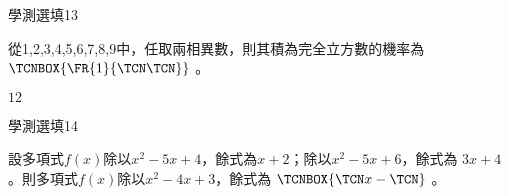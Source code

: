 \begin{QUESTIONS}
\begin{QUESTION}
\begin{QSOLLIST}
        \end{QSOLLIST}
        \begin{QEMPTYSPACE}
        \end{QEMPTYSPACE}
    \end{QUESTION}
    \begin{QUESTION}
        \begin{ExamInfo}{90}{學測}{選填}{13}
        \end{ExamInfo}
        \begin{ExamAnsRateInfo}{}{}{}{}
        \end{ExamAnsRateInfo}
        \begin{QBODY}
			從1,2,3,4,5,6,7,8,9中，任取兩相異數，則其積為完全立方數的機率為$\TCNBOX{\FR{1}{\TCN\TCN}}$
          。
        \end{QBODY}
        \begin{QFROMS}
        \end{QFROMS}
        \begin{QTAGS}\end{QTAGS}
        \begin{QANS}
            $12$
        \end{QANS}
        \begin{QSOLLIST}
        \end{QSOLLIST}
        \begin{QEMPTYSPACE}
        \end{QEMPTYSPACE}
    \end{QUESTION}
    \begin{QUESTION}
        \begin{ExamInfo}{90}{學測}{選填}{14}
        \end{ExamInfo}
        \begin{ExamAnsRateInfo}{}{}{}{}
        \end{ExamAnsRateInfo}
        \begin{QBODY}
		設多項式$f\left( x \right)$除以${{x}^{2}}-5x+4$，餘式為$x+2$；除以${{x}^{2}}-5x+6$，餘式為
$3x+4$。則多項式$f\left( x \right)$除以${{x}^{2}}-4x+3$，餘式為   $\TCNBOX{\TCN x - \TCN }$   。


\end{QBODY}
\end{QUESTION}
\end{QUESTIONS}
